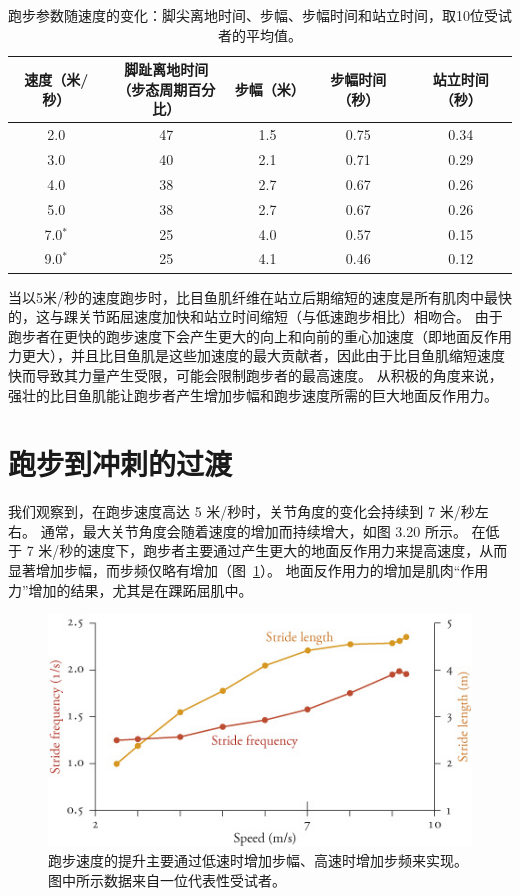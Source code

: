 \begin{table}[htbp]
	\caption{跑步参数随速度的变化：脚尖离地时间、步幅、步幅时间和站立时间，取10位受试者的平均值。} \label{tab:12_1} \centering
	\begin{tabular}{ccccc} %
		\toprule
		速度（米/秒）& \makecell{脚趾离地时间\\（步态周期百分比）} & 步幅（米） & 步幅时间（秒） & 站立时间（秒）\\
		\midrule
		2.0 & 47 & 1.5 & 0.75 & 0.34 \\
		3.0 & 40 & 2.1 & 0.71 & 0.29 \\
		4.0 & 38 & 2.7 & 0.67 & 0.26 \\
		5.0 & 38 & 2.7 & 0.67 & 0.26 \\
		7.0$^*$ & 25 & 4.0 & 0.57 & 0.15 \\
		9.0$^*$ & 25 & 4.1 & 0.46 & 0.12 \\
		\bottomrule
	\end{tabular}
\end{table}


当以5米/秒的速度跑步时，比目鱼肌纤维在站立后期缩短的速度是所有肌肉中最快的，这与踝关节跖屈速度加快和站立时间缩短（与低速跑步相比）相吻合。
由于跑步者在更快的跑步速度下会产生更大的向上和向前的重心加速度（即地面反作用力更大），并且比目鱼肌是这些加速度的最大贡献者，因此由于比目鱼肌缩短速度快而导致其力量产生受限，可能会限制跑步者的最高速度。
从积极的角度来说，强壮的比目鱼肌能让跑步者产生增加步幅和跑步速度所需的巨大地面反作用力。


\section{跑步到冲刺的过渡}

我们观察到，在跑步速度高达 5 米/秒时，关节角度的变化会持续到 7 米/秒左右。
通常，最大关节角度会随着速度的增加而持续增大，如图 3.20 所示。
在低于 7 米/秒的速度下，跑步者主要通过产生更大的地面反作用力来提高速度，从而显著增加步幅，而步频仅略有增加（图~\ref{fig:12_5}）。
地面反作用力的增加是肌肉“作用力”增加的结果，尤其是在踝跖屈肌中。


\begin{figure}[!htb]
	\centering
	\includegraphics[width=0.8\linewidth]{chap12/12_5}
	\caption{跑步速度的提升主要通过低速时增加步幅、高速时增加步频来实现。
		图中所示数据来自一位代表性受试者\cite{weyand2000faster}。 \label{fig:12_5}}
\end{figure}

